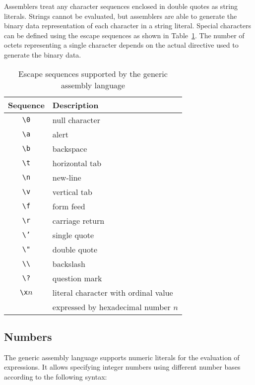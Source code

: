 Assemblers treat any character sequences enclosed in double quotes as string literals.
Strings cannot be evaluated, but assemblers are able to generate the binary data representation of each character in a string literal.
Special characters can be defined using the escape sequences as shown in Table~\ref{tab:asmescapesequences}.
The number of octets representing a single character depends on the actual directive used to generate the binary data.

\begin{table}
\centering
\begin{tabular}{@{}cl@{}}
\toprule Sequence & Description \\ \midrule
\texttt{\textbackslash 0} & null character \\
\texttt{\textbackslash a} & alert \\
\texttt{\textbackslash b} & backspace \\
\texttt{\textbackslash t} & horizontal tab \\
\texttt{\textbackslash n} & new-line \\
\texttt{\textbackslash v} & vertical tab \\
\texttt{\textbackslash f} & form feed \\
\texttt{\textbackslash r} & carriage return \\
\texttt{\textbackslash '} & single quote \\
\texttt{\textbackslash "} & double quote \\
\texttt{\textbackslash \textbackslash} & backslash \\
\texttt{\textbackslash ?} & question mark \\
\texttt{\textbackslash x}$n$ & literal character with ordinal value \\ & expressed by hexadecimal number $n$ \\
\bottomrule
\end{tabular}
\caption{Escape sequences supported by the generic assembly language}
\label{tab:asmescapesequences}
\end{table}

\subsection{Numbers}

The generic assembly language supports numeric literals for the evaluation of expressions.
It allows specifying integer numbers using different number bases according to the following syntax:

